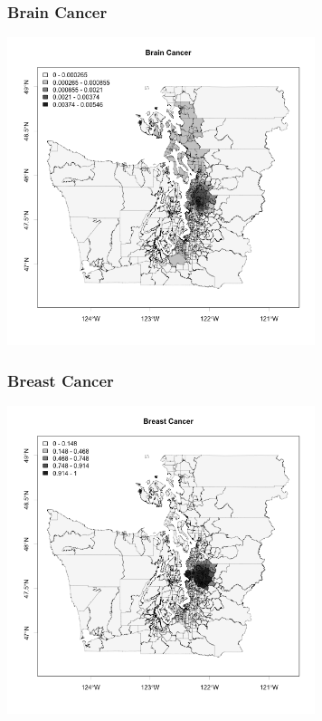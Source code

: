 \documentclass[handout]{beamer}
\begin{document}
\begin{frame}[fragile]
\frametitle{Brain Cancer}
\begin{center}
\includegraphics[width=9cm]{figure/brain.png}
\end{center}
\end{frame}


\begin{frame}[fragile]
\frametitle{Breast Cancer}
\begin{center}
\includegraphics[width=9cm]{figure/breast.png}
\end{center}
\end{frame}
\end{document}
